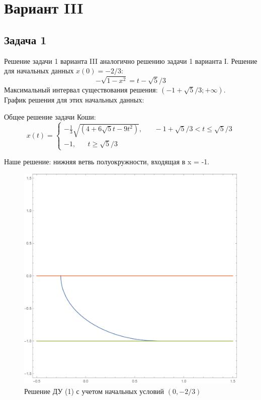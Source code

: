 \documentclass[a4paper, 12pt]{article}
\begin{document}
	\section{Вариант III}
		\subsection {Задача 1}

Решение задачи 1 варианта III аналогично решению задачи 1 варианта I. Решение для начальных данных $x(0)=-2/3$:
\[-\sqrt{1-x^2} = t - \sqrt{5}/3\]
Максимальный интервал существования решения: $(-1+ \sqrt{5}/3; +\infty)$.\\
График решения для этих начальных данных:

Общее решение задачи Коши:
\begin{equation*}
x(t) = 
 \begin{cases}
   -\frac 1 3 \sqrt{(4+6\sqrt{5}t-9t^{2})}, \;\;\;\;\;\; -1+ \sqrt{5}/3 < t \leq \sqrt{5}/3\\
   -1, \;\;\;\;\;\; t\geq \sqrt{5}/3
 \end{cases}
\end{equation*}


Наше решение: нижняя ветвь полуокружности, входящая в x = -1.

\begin{figure}[H]
	\centering
	\includegraphics[scale=0.47]{3.png}
	\caption{Решение ДУ (1) с учетом начальных условий $(0, -2/3)$}
\end{figure}
\end{document}
